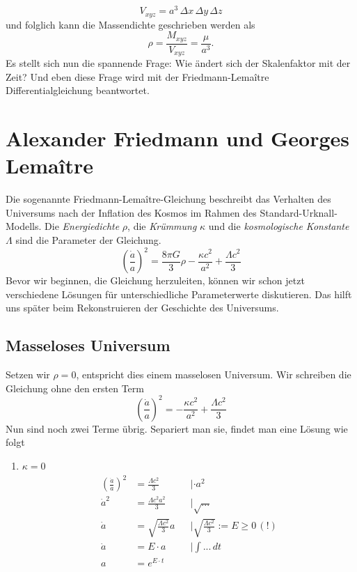 \begin{refsection}
\begin{equation}
V_{xyz} = a^3 \,\Delta x \,\Delta y \,\Delta z
\end{equation}
und folglich kann die Massendichte geschrieben werden als
\begin{equation}
\rho = \frac{M_{xyz}}{V_{xyz}} = \frac{\mu}{a^3}.
\label{friedmann:dichte}
\end{equation}
Es stellt sich nun die spannende Frage: Wie ändert sich der Skalenfaktor mit der Zeit? Und eben diese Frage wird mit der Friedmann-Lema\^{i}tre Differentialgleichung beantwortet.

\section{Alexander Friedmann und Georges Lema\^{i}tre}
Die sogenannte Friedmann-Lema\^{i}tre-Gleichung beschreibt das Verhalten des Universums nach der Inflation des Kosmos im Rahmen des Standard-Urknall-Modells. Die {\em Energiedichte} $\rho$, die {\em Krümmung} $\kappa$ und die {\em kosmologische Konstante} $\Lambda$ sind die Parameter der Gleichung.
\begin{equation}
\left(\frac{\dot{a}}{a}\right) ^2 = \frac{8 \pi G}{3} \rho - \frac{\kappa c^2}{a^2} + \frac{\Lambda c^2}{3}
\end{equation}
Bevor wir beginnen, die Gleichung herzuleiten, können wir schon jetzt verschiedene Lösungen für unterschiedliche Parameterwerte diskutieren. Das hilft uns später beim Rekonstruieren der Geschichte des Universums.

\subsection{Masseloses Universum \label{friedmann:masselosesUniversum}}
Setzen wir $\rho = 0$, entspricht dies einem masselosen Universum.  Wir schreiben die Gleichung ohne den ersten Term
\[\left(\frac{\dot{a}}{a}\right) ^2 = - \frac{\kappa c^2}{a^2} + \frac{\Lambda c^2}{3}\]
Nun sind noch zwei Terme übrig. Separiert man sie, findet man eine Lösung wie folgt
\begin{enumerate}
	\item $\kappa = 0$ 
		\begin{align}
			\nonumber \left(\frac{\dot{a}}{a}\right) ^2 &= \frac{\Lambda c^2}{3}  &&| \cdot a^2 \\
			\nonumber \dot{a} ^2 &= \frac{\Lambda c^2 a^2}{3}  &&|\sqrt{...}\\
			\nonumber \dot{a} &= \sqrt{\frac{\Lambda c^2}{3}} a &&|\sqrt{\frac{\Lambda c^2}{3}} := E \ge 0 \, (!)\\
			\nonumber \dot{a} &= E \cdot a &&|\int ...\, dt \\
			a &= e^{E \cdot t} \label{friedmann:Lambda}
		\end{align}
	

\end{enumerate}
\end{refsection}

